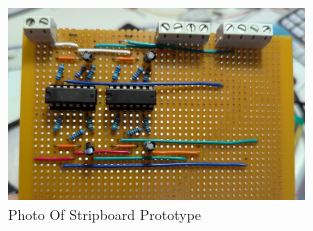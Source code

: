\begin{figure}[htbp] %
  \centering
  \includegraphics[width=0.7\textwidth]{chapters/methodology/prototype/StripboardPhoto.jpg}
  \caption{Photo Of Stripboard Prototype}
  \label{fig:StripboardPhoto}
\end{figure}
\vspace{1em}

